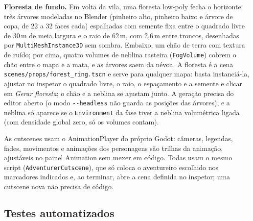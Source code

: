 \documentclass[11pt,a4paper]{article}
\begin{document}
\textbf{Floresta de fundo.} Em volta da vila, uma floresta low-poly fecha o horizonte: três árvores modeladas no Blender (pinheiro alto, pinheiro baixo e árvore de copa, de 22 a 32 faces cada) espalhadas com semente fixa entre o quadrado livre de 30\,m de meia largura e o raio de 62\,m, com 2,6\,m entre troncos, desenhadas por \texttt{MultiMeshInstance3D} sem sombra. Embaixo, um chão de terra com textura de ruído; por cima, quatro volumes de neblina rasteira (\texttt{FogVolume}) cobrem o chão entre o mapa e a mata, e as árvores saem da névoa. A floresta é a cena \texttt{scenes/props/forest\_ring.tscn} e serve para qualquer mapa: basta instanciá-la, ajustar no inspetor o quadrado livre, o raio, o espaçamento e a semente e clicar em \emph{Gerar floresta}; o chão e a neblina se ajustam junto. A geração precisa do editor aberto (o modo \texttt{-{}-headless} não guarda as posições das árvores), e a neblina só aparece se o \texttt{Environment} da fase tiver a neblina volumétrica ligada (com densidade global zero, só os volumes contam).

As cutscenes usam o AnimationPlayer do próprio Godot: câmeras, legendas, fades, movimentos e animações dos personagens são trilhas da animação, ajustáveis no painel Animation sem mexer em código. Todas usam o mesmo script (\texttt{AdventurerCutscene}), que só coloca o aventureiro escolhido nos marcadores indicados e, ao terminar, abre a cena definida no inspetor; uma cutscene nova não precisa de código.

\subsection{Testes automatizados}
\end{document}
